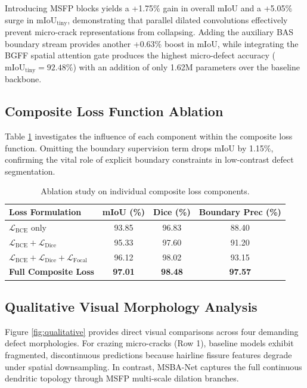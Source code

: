 \documentclass{ieeeaccess}
\begin{document}
Introducing MSFP blocks yields a +1.75\% gain in overall mIoU and a +5.05\% surge in $\text{mIoU}_{\text{tiny}}$, demonstrating that parallel dilated convolutions effectively prevent micro-crack representations from collapsing. Adding the auxiliary BAS boundary stream provides another +0.63\% boost in mIoU, while integrating the BGFF spatial attention gate produces the highest micro-defect accuracy ($\text{mIoU}_{\text{tiny}} = 92.48\%$) with an addition of only 1.62M parameters over the baseline backbone.

\subsection{Composite Loss Function Ablation}
Table \ref{tab:loss_ablation} investigates the influence of each component within the composite loss function. Omitting the boundary supervision term drops mIoU by 1.15\%, confirming the vital role of explicit boundary constraints in low-contrast defect segmentation.

\begin{table}[!t]
\centering
\setlength{\tabcolsep}{3pt}
\fontsize{8pt}{10pt}\selectfont
\caption{Ablation study on individual composite loss components.}
\label{tab:loss_ablation}
\begin{tabular*}{\columnwidth}{@{\extracolsep{\fill}}lccc@{}}
\toprule
\textbf{Loss Formulation} & \textbf{mIoU (\%)} & \textbf{Dice (\%)} & \textbf{Boundary Prec (\%)} \\
\midrule
$\mathcal{L}_{\text{BCE}}$ only & 93.85 & 96.83 & 88.40 \\
$\mathcal{L}_{\text{BCE}} + \mathcal{L}_{\text{Dice}}$ & 95.33 & 97.60 & 91.20 \\
$\mathcal{L}_{\text{BCE}} + \mathcal{L}_{\text{Dice}} + \mathcal{L}_{\text{Focal}}$ & 96.12 & 98.02 & 93.15 \\
\textbf{Full Composite Loss} & \textbf{97.01} & \textbf{98.48} & \textbf{97.57} \\
\bottomrule
\end{tabular*}
\end{table}

\subsection{Qualitative Visual Morphology Analysis}
Figure \ref{fig:qualitative} provides direct visual comparisons across four demanding defect morphologies. For crazing micro-cracks (Row 1), baseline models exhibit fragmented, discontinuous predictions because hairline fissure features degrade under spatial downsampling. In contrast, MSBA-Net captures the full continuous dendritic topology through MSFP multi-scale dilation branches.
\end{document}
